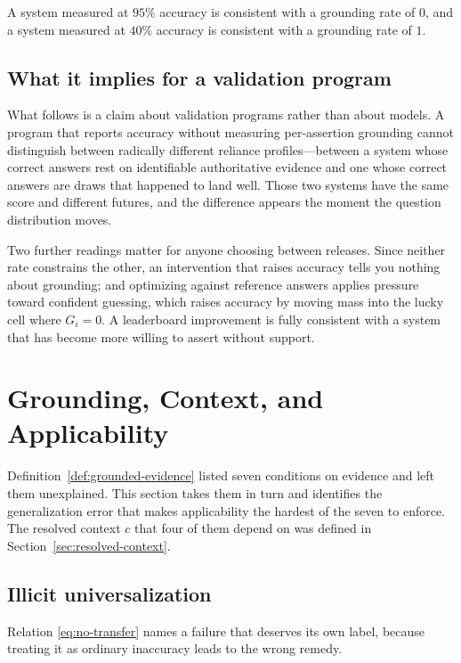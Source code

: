\begin{corollary}
\label{cor:no-bound}
A system measured at $95\%$ accuracy is consistent with a grounding rate of $0$,
and a system measured at $40\%$ accuracy is consistent with a grounding rate of
$1$.
\end{corollary}

\subsection{What it implies for a validation program}

What follows is a claim about validation programs rather than about models. A
program that reports accuracy without measuring per-assertion grounding cannot
distinguish between radically different reliance profiles---between a system whose
correct answers rest on identifiable authoritative evidence and one whose correct
answers are draws that happened to land well. Those two systems have the same
score and different futures, and the difference appears the moment the question
distribution moves.

Two further readings matter for anyone choosing between releases. Since neither rate constrains the other, an intervention that raises accuracy tells you nothing
about grounding; and optimizing against reference answers applies pressure toward
confident guessing, which raises accuracy by moving mass into the lucky cell where
$G_i = 0$. A leaderboard improvement is fully consistent with a system that has
become more willing to assert without support.

\section{Grounding, Context, and Applicability}
\label{ch:grounding-context}
\label{sec:grounding-context}

Definition~\ref{def:grounded-evidence} listed seven conditions on evidence and left
them unexplained. This section takes them in turn and identifies the generalization
error that makes applicability the hardest of the seven to enforce. The resolved context
$c$ that four of them depend on was defined in Section~\ref{sec:resolved-context}.

\subsection{Illicit universalization}
\label{sec:illicit}

Relation \eqref{eq:no-transfer} names a failure that deserves its own label,
because treating it as ordinary inaccuracy leads to the wrong remedy.

